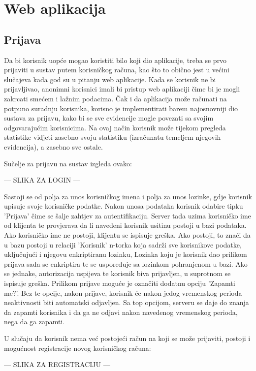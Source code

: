 \documentclass[times, utf8, zavrsni]{fer}
\begin{document}
\chapter{Web aplikacija}

\section{Prijava}
Da bi korisnik uopće mogao koristiti bilo koji dio aplikacije, treba se prvo prijaviti u sustav putem korisničkog računa, kao što to obično jest u većini slučajeva kada god su u pitanju web aplikacije. Kada se korisnik ne bi prijavljivao, anonimni korisnici imali bi pristup web aplikaciji čime bi je mogli zakrcati smećem i lažnim podacima. Čak i da aplikacija može računati na potpuno suradnju korisnika, korisno je implementirati barem najosnovniji dio sustava za prijavu, kako bi se sve evidencije mogle povezati sa svojim odgovarajućim korisnicima. Na ovaj način korisnik može tijekom pregleda statistike vidjeti zasebno svoju statistiku (izračunatu temeljem njegovih evidencija), a zasebno sve ostale.

Sučelje za prijavu na sustav izgleda ovako:

--- SLIKA ZA LOGIN ---

Sastoji se od polja za unos korisničkog imena i polja za unos lozinke, gdje korisnik upisuje svoje korisničke podatke. Nakon unosa podataka korisnik odabire tipku 'Prijava' čime se šalje zahtjev za autentifikaciju. Server tada uzima korisničko ime od klijenta te provjerava da li navedeni korisnik usitinu postoji u bazi podataka. Ako korisničko ime ne postoji, klijentu se ispisuje greška. Ako postoji, to znači da u bazu postoji u relaciji 'Korisnik' n-torka koja sadrži sve korisnikove podatke, uključujući i njegovu enkriptiranu lozinku, Lozinka koju je korisnik dao prilikom prijava sada se enkriptira te se uspoređuje sa lozinkom pohranjenom u bazi. Ako se jednake, autorizacija uspijeva te korisnik biva prijavljen, u suprotnom se ispisuje greška. 
Prilikom prijave moguće je označiti dodatnu opciju 'Zapamti me?'. Bez te opcije, nakon prijave, korisnik će nakon jedog vremenskog perioda neaktivnosti biti automatski odjavljen. Sa top opcijom, serveru se daje do znanja da zapamti korisnika i da ga ne odjavi nakon navedenog vremenskog perioda, nega da ga zapamti.

U slučaju da korisnik nema već postojeći račun na koji se može prijaviti, postoji i mogućnost registracije novog korisničkog računa:

--- SLIKA ZA REGISTRACIJU ---
\end{document}
